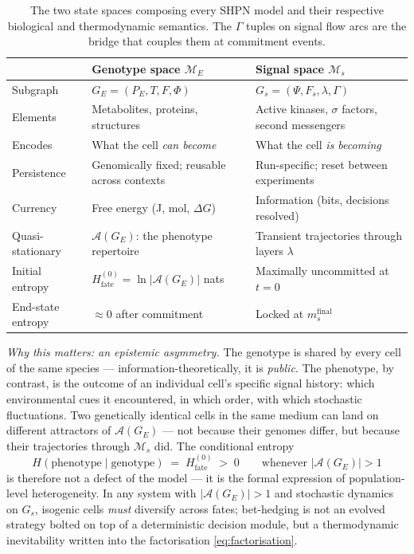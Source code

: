 \documentclass[11pt,a4paper]{article}
\newcommand{\Gs}{G_s}
\newcommand{\Ge}{G_E}
\newcommand{\Aset}{\mathcal{A}}
\newcommand{\Hfate}{H_{\mathrm{fate}}}
\begin{document}
\begin{table}[h]
\centering
\caption{The two state spaces composing every SHPN model and their
respective biological and thermodynamic semantics.  The \(\Gamma\)
tuples on signal flow arcs are the bridge that couples them at
commitment events.}
\label{tab:two-spaces}
{\small
\begin{tabular}{@{}lp{4.2cm}p{4.2cm}@{}}
\toprule
                       & \textbf{Genotype space} \(\mathcal{M}_E\)
                       & \textbf{Signal space} \(\mathcal{M}_s\) \\
\midrule
Subgraph               & \(\Ge = (P_E, T, F, \Phi)\)
                       & \(\Gs = (\Psi, F_s, \lambda, \Gamma)\) \\
Elements               & Metabolites, proteins, structures
                       & Active kinases, \(\sigma\) factors, second messengers \\
Encodes                & What the cell \emph{can become}
                       & What the cell \emph{is becoming} \\
Persistence            & Genomically fixed; reusable across contexts
                       & Run-specific; reset between experiments \\
Currency               & Free energy (J, mol, \(\Delta G\))
                       & Information (bits, decisions resolved) \\
Quasi-stationary       & \(\Aset(\Ge)\): the phenotype repertoire
                       & Transient trajectories through layers \(\lambda\) \\
Initial entropy        & \(\Hfate^{(0)} = \ln|\Aset(\Ge)|\) nats
                       & Maximally uncommitted at \(t=0\) \\
End-state entropy      & \(\approx 0\) after commitment
                       & Locked at \(m_s^{\mathrm{final}}\) \\
\bottomrule
\end{tabular}}
\end{table}

\medskip\noindent\textit{Why this matters: an epistemic asymmetry.}
The genotype is shared by every cell of the same species ---
information-theoretically, it is \emph{public}.  The phenotype, by
contrast, is the outcome of an individual cell's specific signal
history: which environmental cues it encountered, in which order,
with which stochastic fluctuations.  Two genetically identical cells in
the same medium can land on different attractors of \(\Aset(\Ge)\) ---
not because their genomes differ, but because their trajectories
through \(\mathcal{M}_s\) did.  The conditional entropy
\begin{equation}
  H(\mathrm{phenotype} \mid \mathrm{genotype}) \;=\; \Hfate^{(0)} \;>\; 0
  \qquad \text{whenever } |\Aset(\Ge)| > 1
\end{equation}
is therefore not a defect of the model --- it is the formal expression
of population-level heterogeneity.  In any system with \(|\Aset(\Ge)|
> 1\) and stochastic dynamics on \(\Gs\), isogenic cells \emph{must}
diversify across fates; bet-hedging is not an evolved strategy bolted
on top of a deterministic decision module, but a thermodynamic
inevitability written into the factorisation \eqref{eq:factorisation}.
\end{document}
